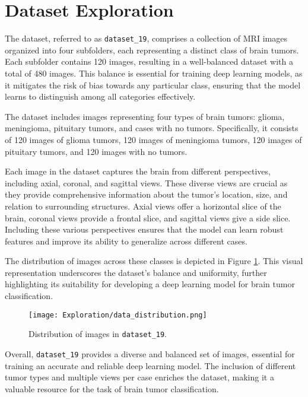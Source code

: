 \section{Dataset Exploration}\label{dataset_exploration}

The dataset, referred to as \texttt{dataset\_19}, comprises a collection of MRI images organized into four subfolders, each representing a distinct class of brain tumors. Each subfolder contains 120 images, resulting in a well-balanced dataset with a total of 480 images. This balance is essential for training deep learning models, as it mitigates the risk of bias towards any particular class, ensuring that the model learns to distinguish among all categories effectively.

The dataset includes images representing four types of brain tumors: glioma, meningioma, pituitary tumors, and cases with no tumors. Specifically, it consists of 120 images of glioma tumors, 120 images of meningioma tumors, 120 images of pituitary tumors, and 120 images with no tumors.

Each image in the dataset captures the brain from different perspectives, including axial, coronal, and sagittal views. These diverse views are crucial as they provide comprehensive information about the tumor's location, size, and relation to surrounding structures. Axial views offer a horizontal slice of the brain, coronal views provide a frontal slice, and sagittal views give a side slice. Including these various perspectives ensures that the model can learn robust features and improve its ability to generalize across different cases.

The distribution of images across these classes is depicted in Figure \ref{fig:data_distribution}. This visual representation underscores the dataset's balance and uniformity, further highlighting its suitability for developing a deep learning model for brain tumor classification.

\begin{figure}[H]
  \begin{center}
    \texttt{[image: Exploration/data\_distribution.png]}
  \end{center}
  \caption{Distribution of images in \texttt{dataset\_19}.}\label{fig:data_distribution}
\end{figure}

Overall, \texttt{dataset\_19} provides a diverse and balanced set of images, essential for training an accurate and reliable deep learning model. The inclusion of different tumor types and multiple views per case enriches the dataset, making it a valuable resource for the task of brain tumor classification.

